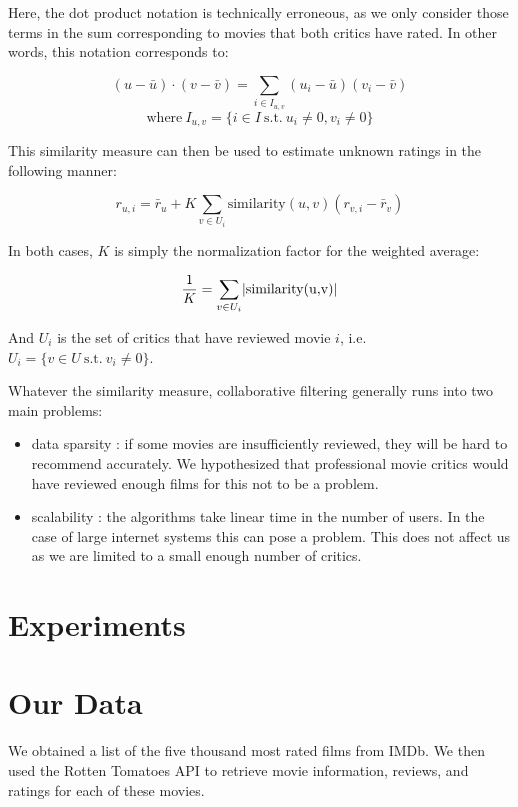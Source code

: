 \documentclass[10.5pt]{article}
\DeclarePairedDelimiter\abs{\lvert}{\rvert}%
\begin{document}
Here, the dot product notation is technically erroneous, as we only consider
those terms in the sum corresponding to movies that both critics have rated.
In other words, this notation corresponds to:

$$ (u - \bar{u}) \cdot (v - \bar{v}) = 
\sum_{i \in I_{u,v}} (u_i - \bar{u})(v_i - \bar{v}) $$
$$ \text{where} \  I_{u,v} = 
\{ i \in I \  \text{s.t.} \   u_i \neq 0, v_i \neq 0 \} $$

This similarity measure can then be used to estimate unknown ratings in the
following manner:

$$ r_{u,i} = 
\bar{r}_u + K \sum_{v \in U_i} \text{similarity}(u,v) (r_{v,i}-\bar{r}_v) $$

In both cases, $K$ is simply the normalization factor for the weighted average:

$$ \frac{1}{K} = \sum_{v \in U_i} \abs{\text{similarity(u,v)}} $$

And $U_i$ is the set of critics that have reviewed movie $i$, i.e.
$U_i = \{ v \in U \  \text{s.t.} \  v_i \neq 0 \}$.

Whatever the similarity measure, collaborative filtering generally runs into
two main problems:

\begin{itemize}

    \item data sparsity : if some movies are insufficiently reviewed, they will
        be hard to recommend accurately. We hypothesized that professional
        movie critics would have reviewed enough films for this not to be a
        problem.

    \item scalability : the algorithms take linear time in the number of users.
        In the case of large internet systems this can pose a problem. This
        does not affect us as we are limited to a small enough number of
        critics.

\end{itemize}

\section{Experiments}

\section{Our Data}

We obtained a list of the five thousand most rated films from IMDb. We then 
used the Rotten Tomatoes API to retrieve movie information, reviews, and 
ratings for each of these movies.  
\end{document}
